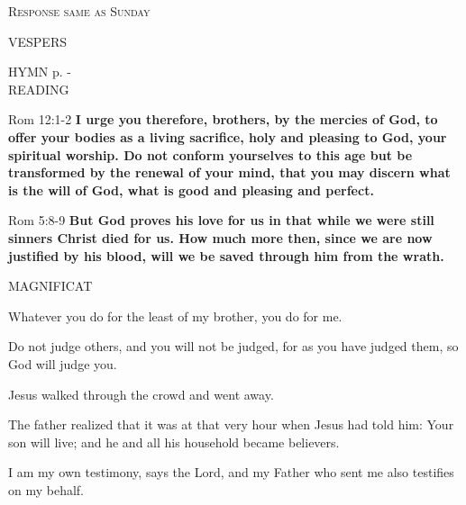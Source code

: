 \begin{center}\textsc{Response same as Sunday}\end{center}

\begin{flushleft}\normalsize{\uppercase{VESPERS\\}}\end{flushleft}
\small{\uppercase{HYMN} p. \pageref{lent:firstHymn}-\pageref{lent:lastHymn}\\}
\noindent\small READING
\begin{description}[labelindent=\parindent, leftmargin=*]
\item [Weeks 1-4:]      Rom 12:1-2 \textbf{     I urge you therefore, brothers, by the mercies of God, to offer your bodies as a living sacrifice, holy and pleasing to God, your spiritual worship. Do not conform yourselves to this age but be transformed by the renewal of your mind, that you may discern what is the will of God, what is good and pleasing and perfect.\\}
\item [Week 5:]     Rom 5:8-9     \textbf{But God proves his love for us in that while we were still sinners Christ died for us. How much more then, since we are now justified by his blood, will we be saved through him from the wrath.}
\end{description}

\noindent\small MAGNIFICAT
\begin{description}[labelindent=\parindent, leftmargin=*]
\item [Week 1:] 	Whatever you do for the least of my brother, you do for me.
\item [Week 2:] 	Do not judge others, and you will not be judged, for as you have judged them, so God will judge you.
\item [Week 3:] 	Jesus walked through the crowd and went away.
\item [Week 4:] 	The father realized that it was at that very hour when Jesus had told him: Your son will live; and he and all his household became believers.
\item [Week 5:] 	I am my own testimony, says the Lord, and my Father who sent me also testifies on my behalf.
\end{description}
